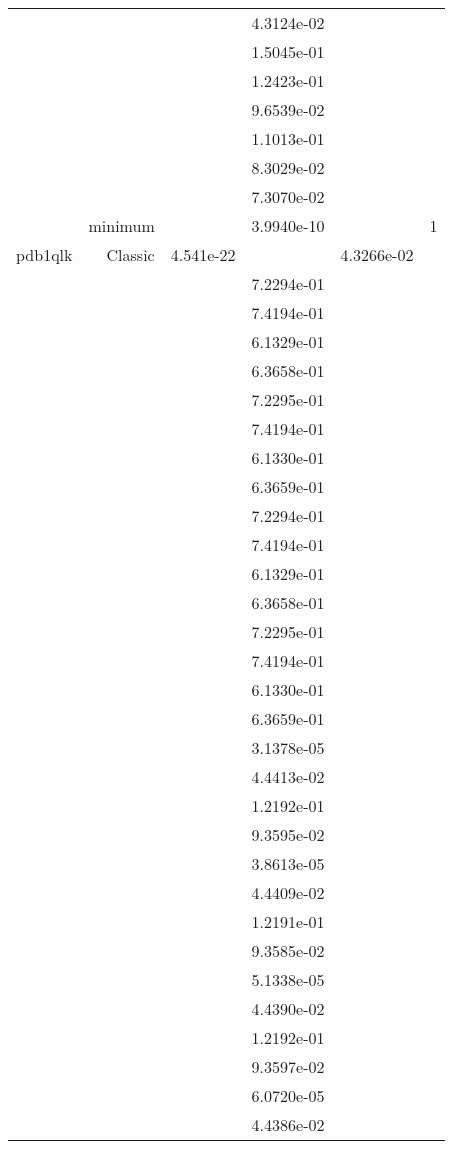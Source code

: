 \begin{xltabular}{\textwidth}{r|rS[table-format=1.3e+2]S[table-format=1.4e+2]S[table-format=1.4e+2]S[table-format=-1.5]}
&  &  & 4.3124e-02 & & \\
&  &  & 1.5045e-01 & & \\
&  &  & 1.2423e-01 & & \\
&  &  & 9.6539e-02 & & \\
&  &  & 1.1013e-01 & & \\
&  &  & 8.3029e-02 & & \\
&  &  & 7.3070e-02 & & \\
& minimum &  & 3.9940e-10 & & 1 \\  \addlinespace
pdb1qlk & Classic & 4.541e-22 &  & 4.3266e-02 & \\
&  &  & 7.2294e-01 & & \\
&  &  & 7.4194e-01 & & \\
&  &  & 6.1329e-01 & & \\
&  &  & 6.3658e-01 & & \\
&  &  & 7.2295e-01 & & \\
&  &  & 7.4194e-01 & & \\
&  &  & 6.1330e-01 & & \\
&  &  & 6.3659e-01 & & \\
&  &  & 7.2294e-01 & & \\
&  &  & 7.4194e-01 & & \\
&  &  & 6.1329e-01 & & \\
&  &  & 6.3658e-01 & & \\
&  &  & 7.2295e-01 & & \\
&  &  & 7.4194e-01 & & \\
&  &  & 6.1330e-01 & & \\
&  &  & 6.3659e-01 & & \\
&  &  & 3.1378e-05 & & \\
&  &  & 4.4413e-02 & & \\
&  &  & 1.2192e-01 & & \\
&  &  & 9.3595e-02 & & \\
&  &  & 3.8613e-05 & & \\
&  &  & 4.4409e-02 & & \\
&  &  & 1.2191e-01 & & \\
&  &  & 9.3585e-02 & & \\
&  &  & 5.1338e-05 & & \\
&  &  & 4.4390e-02 & & \\
&  &  & 1.2192e-01 & & \\
&  &  & 9.3597e-02 & & \\
&  &  & 6.0720e-05 & & \\
&  &  & 4.4386e-02 & & \\

\end{xltabular}
